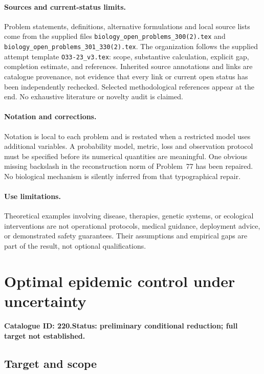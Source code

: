 \documentclass[11pt]{article}
\begin{document}
\paragraph{Sources and current-status limits.}
Problem statements, definitions, alternative formulations and local source lists
come from the supplied files
\texttt{biology\_open\_problems\_300(2).tex} and
\texttt{biology\_open\_problems\_301\_330(2).tex}.
The organization follows the supplied attempt template
\texttt{O33-23\_v3.tex}: scope, substantive calculation, explicit gap,
completion estimate, and references. Inherited source annotations and links are
catalogue provenance, not evidence that every link or current open status has
been independently rechecked. Selected methodological references appear at the
end. No exhaustive literature or novelty audit is claimed.

\paragraph{Notation and corrections.}
Notation is local to each problem and is restated when a restricted model uses
additional variables. A probability model, metric, loss and observation protocol
must be specified before its numerical quantities are meaningful. One obvious
missing backslash in the reconstruction norm of Problem~77 has been repaired.
No biological mechanism is silently inferred from that typographical repair.

\paragraph{Use limitations.}
Theoretical examples involving disease, therapies, genetic systems, or ecological
interventions are not operational protocols, medical guidance, deployment advice,
or demonstrated safety guarantees. Their assumptions and empirical gaps are part
of the result, not optional qualifications.

\setcounter{section}{219}
\section{Optimal epidemic control under uncertainty}
\label{prob:220}
\noindent\textbf{Catalogue ID: 220.}\quad \textbf{Status: preliminary conditional reduction; full target not established.}
\subsection{Target and scope}
\end{document}
